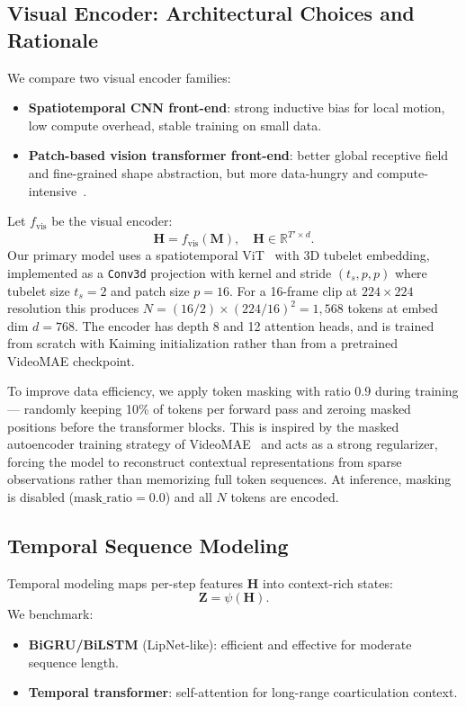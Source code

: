 \documentclass[10pt,twocolumn,letterpaper]{article}
\begin{document}
\subsection{Visual Encoder: Architectural Choices and Rationale}
We compare two visual encoder families:
\begin{itemize}[leftmargin=*]
    \item \textbf{Spatiotemporal CNN front-end}: strong inductive bias for local motion, low compute overhead, stable training on small data.
    \item \textbf{Patch-based vision transformer front-end}: better global receptive field and fine-grained shape abstraction, but more data-hungry and compute-intensive~\cite{dosovitskiy2021vit,tong2022videomae}.
\end{itemize}

Let $f_{\text{vis}}$ be the visual encoder:
\begin{equation}
\mathbf{H} = f_{\text{vis}}(\mathbf{M}), \quad \mathbf{H}\in \mathbb{R}^{T' \times d}.
\end{equation}
Our primary model uses a spatiotemporal ViT~\cite{dosovitskiy2021vit,tong2022videomae} with 3D tubelet embedding, implemented as a \texttt{Conv3d} projection with kernel and stride $(t_s, p, p)$ where tubelet size $t_s{=}2$ and patch size $p{=}16$. For a 16-frame clip at $224{\times}224$ resolution this produces $N{=}(16/2){\times}(224/16)^2 = 1{,}568$ tokens at embed dim $d{=}768$. The encoder has depth 8 and 12 attention heads, and is trained from scratch with Kaiming initialization rather than from a pretrained VideoMAE checkpoint.

To improve data efficiency, we apply token masking with ratio $0.9$ during training — randomly keeping 10\% of tokens per forward pass and zeroing masked positions before the transformer blocks. This is inspired by the masked autoencoder training strategy of VideoMAE~\cite{tong2022videomae} and acts as a strong regularizer, forcing the model to reconstruct contextual representations from sparse observations rather than memorizing full token sequences. At inference, masking is disabled ($\text{mask\_ratio}{=}0.0$) and all $N$ tokens are encoded.

\subsection{Temporal Sequence Modeling}
Temporal modeling maps per-step features $\mathbf{H}$ into context-rich states:
\begin{equation}
\mathbf{Z} = \psi(\mathbf{H}).
\end{equation}
We benchmark:
\begin{itemize}[leftmargin=*]
    \item \textbf{BiGRU/BiLSTM} (LipNet-like): efficient and effective for moderate sequence length.
    \item \textbf{Temporal transformer}: self-attention for long-range coarticulation context.
\end{itemize}
\end{document}

